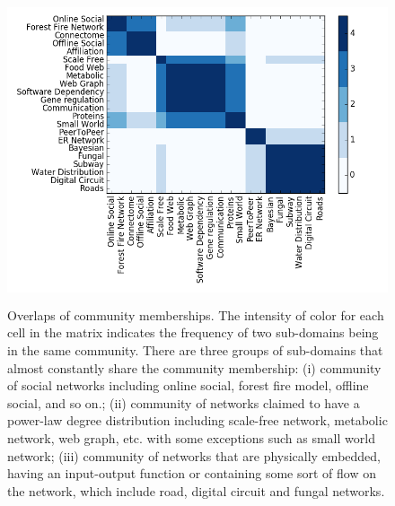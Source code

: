\documentclass{article}
\begin{document}
\begin{figure}[ht]
		\begin{center}
		\vspace{0.5cm}
		\includegraphics[clip,width=12cm,height = 9cm]{figs/overlaps.png}
		\vspace{0.5cm}
		\caption{Overlaps of community memberships. The intensity of color for each cell in the matrix indicates the frequency of two sub-domains being in the same community.  There are three groups of sub-domains that almost constantly share the community membership: (i) community of social networks including online social, forest fire model, offline social, and so on.; (ii) community of networks claimed to have a power-law degree distribution including scale-free network, metabolic network, web graph, etc. with some exceptions such as small world network; (iii) community of networks that are physically embedded, having an input-output function or containing some sort of flow on the network, which include road, digital circuit and fungal networks.}
		\label{community_overlaps}
 		\end{center}
\end{figure}

\end{document}
